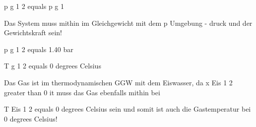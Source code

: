 p g 1 2 equals p g 1

Das System muss mithin im Gleichgewicht mit dem p Umgebung - druck und der Gewichtskraft sein!

p g 1 2 equals 1.40 bar

T g 1 2 equals 0 degrees Celsius

Das Gas ist im thermodynamischen GGW mit dem Eiswasser, da x Eis 1 2 greater than 0 it muss das Gas ebenfalls mithin bei

T Eis 1 2 equals 0 degrees Celsius sein und somit ist auch die Gastemperatur bei 0 degrees Celsius!